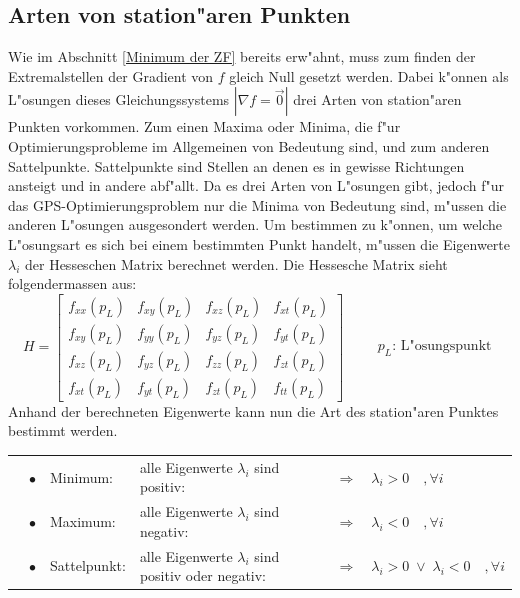 \begin{refsection}
\subsection{Arten von station"aren Punkten}\label{stat_Punkte}
Wie im Abschnitt \ref{Minimum der ZF} bereits erw"ahnt, muss zum finden
der Extremalstellen der Gradient von $f$ gleich Null gesetzt werden. Dabei
k"onnen als L"osungen dieses Gleichungssystems $|\nabla f = \vec 0 |$
drei Arten von station"aren Punkten vorkommen. Zum einen Maxima oder
Minima, die f"ur Optimierungsprobleme im Allgemeinen von Bedeutung sind,
und zum anderen Sattelpunkte. Sattelpunkte sind Stellen an denen es in
gewisse Richtungen ansteigt und in andere abf"allt. Da es drei Arten von
L"osungen gibt, jedoch f"ur das GPS-Optimierungsproblem nur die Minima
von Bedeutung sind, m"ussen die anderen L"osungen ausgesondert werden. Um
bestimmen zu k"onnen, um welche L"osungsart es sich bei einem bestimmten
Punkt handelt, m"ussen die Eigenwerte $\lambda_i$ der Hesseschen Matrix
berechnet werden. Die Hessesche Matrix sieht folgendermassen aus:
\[
		H = \begin{bmatrix} 
		f_{xx}(p_L) & f_{xy}(p_L) & f_{xz}(p_L) & f_{xt}(p_L)\\
		f_{xy}(p_L) & f_{yy}(p_L) & f_{yz}(p_L) & f_{yt}(p_L)\\
		f_{xz}(p_L) & f_{yz}(p_L) & f_{zz}(p_L) & f_{zt}(p_L)\\
		f_{xt}(p_L) & f_{yt}(p_L) & f_{zt}(p_L) & f_{tt}(p_L)
		\end{bmatrix} \qquad\begin{array}{l} p_L\text{: L"osungspunkt}\end{array}
\]
Anhand der berechneten Eigenwerte kann nun die Art des station"aren
Punktes bestimmt werden.
\begin{center}
\begin{tabular}{lcllcl}
	& $\bullet$ & Minimum: & alle Eigenwerte $\lambda_i$ sind positiv: & $\Rightarrow$ & $\lambda_i > 0\quad,\forall i$\\
	& $\bullet$ & Maximum: & alle Eigenwerte $\lambda_i$ sind negativ: & $\Rightarrow$ & $\lambda_i < 0\quad,\forall i$\\
	& $\bullet$ & Sattelpunkt: & alle Eigenwerte $\lambda_i$ sind positiv oder negativ: & $\Rightarrow$ & $\lambda_i > 0 \;\lor\; \lambda_i < 0\quad,\forall i$\\
\end{tabular}
\end{center}


\end{refsection}
